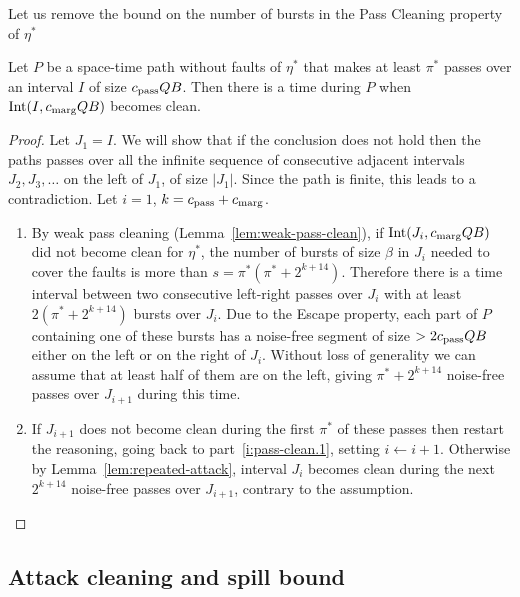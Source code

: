 \documentclass[11pt]{memoir}
\theoremstyle{definition} %
\def\B{B}
\newcommand{\Int}{\mathrm{Int}} %
\newcommand{\passno}{\pi}
\newcommand{\Q}{Q} %
\newcommand{\s}{s} %
\newcommand{\cns}[1]{c_{\textrm{\upshape #1}}}
\newcommand{\CMarg}{\cns{marg}}
\newcommand{\CPass}{\cns{pass}}
\begin{document}
Let us remove the bound on the number of bursts
in the Pass Cleaning property of \( \eta^{*} \)

\begin{lemma}\label{lem:pass-clean}
  Let \( P \) be a space-time path without faults of \( \eta^{*} \) that makes
  at least \( \passno^{*} \) passes over an interval \( I \) of size \( \CPass\Q\B \).
  Then there is a time during \( P \) when \( \Int(I,\CMarg\Q\B) \) becomes clean.
\end{lemma}
\begin{proof}
  Let \( J_{1}= I \).
  We will show that if the conclusion does not hold then the paths passes over all the
  infinite sequence of consecutive adjacent intervals  \( J_{2},J_{3},\dots \) 
  on the left of \( J_{1} \), of size \( |J_{1}| \).
  Since the path is finite, this leads to a contradiction.
Let \( i=1 \), \( k=\CPass+\CMarg \).

   \begin{enumerate}
  \item\label{i:pass-clean.1}
  By weak pass cleaning (Lemma~\ref{lem:weak-pass-clean}),
  if \( \Int(J_{i},\CMarg\Q\B) \) did not become clean for \( \eta^{*} \),
  the number of bursts of size \( \beta \)
  in \( J_{i} \) needed to cover the faults is more than \( \s = \passno^{*}(\passno^{*}+2^{k+14}) \).
  Therefore there is a time interval between two consecutive left-right passes over \( J_{i} \)
  with at least \( 2(\passno^{*}+2^{k+14}) \) bursts over \( J_{i} \).
  Due to the Escape property, each part of \( P \)
  containing one of these bursts has a noise-free segment
  of size \( >2\CPass\Q\B \) either on the left or on the right of \( J_{i} \).
  Without loss of generality we can assume that at least half of them are on the left, giving
   \( \passno^{*}+2^{k+14} \)  noise-free passes over \( J_{i+1} \) during this time.

  \item\label{i:first-choice}
  If  \( J_{i+1} \) does not become clean during the first \( \passno^{*} \) of these passes
  then restart the reasoning, going back to part~\ref{i:pass-clean.1}, setting \( i\gets i+1 \).
  Otherwise
by Lemma~\ref{lem:repeated-attack}, interval \( J_{i} \) becomes clean during the next \( 2^{k+14} \)
      noise-free passes over \( J_{i+1} \), contrary to the assumption.
\end{enumerate}
\end{proof}

\subsection{Attack cleaning and spill bound}
\end{document}
